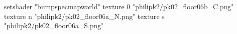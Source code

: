 setshader "bumpspecmapworld"
    texture 0 "philipk2/pk02_floor06b_C.png"
    texture n "philipk2/pk02_floor06a_N.png"
    texture s "philipk2/pk02_floor06a_S.png"